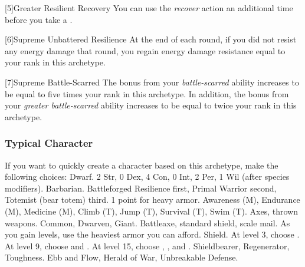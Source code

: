         [5]{Greater Resilient Recovery} You can use the \textit{recover} action an additional time before you take a .

        [6]{Supreme Unbattered Resilience} At the end of each round, if you did not resist any energy damage that round, you regain energy damage resistance equal to your rank in this archetype.

        [7]{Supreme Battle-Scarred} The bonus from your \textit{battle-scarred} ability increases to be equal to five times your rank in this archetype.
        In addition, the bonus from your \textit{greater battle-scarred} ability increases to be equal to twice your rank in this archetype.

        \subsubsection{Typical Character}
            If you want to quickly create a character based on this archetype, make the following choices:
             Dwarf.
             2 Str, 0 Dex, 4 Con, 0 Int, 2 Per, 1 Wil (after species modifiers).
             Barbarian.
             Battleforged Resilience first, Primal Warrior second, Totemist (bear totem) third.
             1 point for heavy armor.
             Awareness (M), Endurance (M), Medicine (M), Climb (T), Jump (T), Survival (T), Swim (T).
             Axes, thrown weapons.
             Common, Dwarven, Giant.
             Battleaxe, standard shield, scale mail. As you gain levels, use the heaviest armor you can afford.
             Shield.
                At level 3, choose .
                At level 9, choose  and .
                At level 15, choose , , and .
             Shieldbearer, Regenerator, Toughness.
             Ebb and Flow, Herald of War, Unbreakable Defense.
